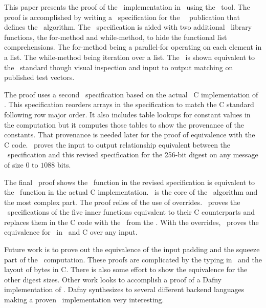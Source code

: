 This paper presents the proof of the \shaThree\ implementation in \openssl\ using the \saw\ tool.
The proof is accomplished by writing a \cryptol\ specification for the \nist\ \fips\ publication that defines the \shaThree\ algorithm.
The \cryptol\ specification is aided with two additional \cryptol\ library functions, the for-method and while-method, to hide the functional list comprehensions.
The for-method being a parallel-for operating on each element in a list.
The while-method being iteration over a list.
The \cryptol\ is shown equivalent to the \fips\ standard though visual inspection and input to output matching on published test vectors.

The proof uses a second \cryptol\ specification based on the actual \openssl\ C implementation of \shaThree.
This specification reorders arrays in the specification to match the C standard following row major order.
It also includes table lookups for constant values in the computation but it computes those tables to show the provenance of the constants.
That provenance is needed later for the proof of equivalence with the C code.
\saw\ proves the input to output relationship equivalent between the \fips\ specification and this revised specification for the 256-bit digest on any message of size $0$ to $1088$ bits.

The final \saw\ proof shows the \keccak\ function in the revised specification is equivalent to the \keccak\ function in the actual C implementation.
\keccak\ is the core of the \shaThree\ algorithm and the most complex part.
The proof relies of the use of overrides.
\saw\ proves the \cryptol\ specifications of the five inner \keccak functions equivalent to their C counterparts and replaces them in the C code with the \sawcore\ from the \cryptol.
With the overrides, \saw\ proves the equivalence for \keccak\ in \cryptol\ and C over any input.

Future work is to prove out the equivalence of the input padding and the squeeze part of the \shaThree\ computation.
These proofs are complicated by the typing in \cryptol\ and the layout of bytes in C.
There is also some effort to show the equivalence for the other digest sizes.
Other work looks to accomplish a proof of a Dafny implementation of \shaThree.
Dafny synthesizes to several different backend languages making a proven \shaThree\ implementation very interesting.

